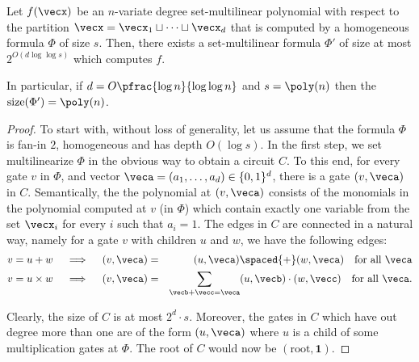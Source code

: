 \begin{lemma}\label{lem:formula set-multilinearization}
  Let $f(\vecx)$ be an $n$-variate degree set-multilinear polynomial with respect to the partition $\vecx = \vecx_1\sqcup \cdots \sqcup \vecx_d$ that is computed by a homogeneous formula $\Phi$ of size $s$.
Then, there exists a set-multilinear formula $\Phi'$ of size at most $2^{O(d\log \log s)}$ which computes $f$.

In particular, if $d = O\pfrac{\log n}{\log \log n}$ and $s = \poly(n)$ then the $\mathrm{size}(\Phi') = \poly(n)$.  
\end{lemma}
\begin{proof}
To start with, without loss of generality, let us assume that the formula $\Phi$ is fan-in $2$, homogeneous and has depth $O(\log s)$.
In the first step, we set multilinearize $\Phi$ in the obvious way to obtain a circuit $C$.
To this end, for every gate $v$ in $\Phi$, and vector $\veca = (a_1,\ldots, a_d) \in \{0,1\}^d$, there is a gate $(v, \veca)$ in $C$.
Semantically, the the polynomial at $(v,\veca)$ consists of the monomials in the polynomial computed at $v$ (in $\Phi$) which contain exactly one variable from the set $\vecx_i$ for every $i$ such that $a_i = 1$.
The edges in $C$ are connected in a natural way, namely for a gate $v$ with children $u$ and $w$, we have the following edges:
\begin{eqnarray*}
\text{$v = u + w$}\quad\implies\quad (v, \veca) &=& (u, \veca) \spaced{+} (w, \veca)\quad\text{for all $\veca$}\\
\text{$v = u \times w$}\quad\implies\quad (v, \veca) &=& \sum_{\vecb + \vecc = \veca} (u, \vecb)\cdot (w, \vecc) \quad\text{for all $\veca$}.
\end{eqnarray*}
 
Clearly, the size of $C$ is at most $2^d\cdot s$.
Moreover, the gates in $C$ which have out degree more than one are of the form $(u,\veca)$ where $u$ is a child of some multiplication gates at $\Phi$. 
The root of $C$ would now be $(\text{root},\mathbf{1})$. 


\end{proof}
